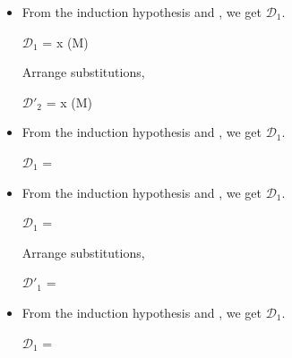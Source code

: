 \begin{itemize}
	\item \QEta
	      	      	      	      
	      From the induction hypothesis and \QEta, we get $\mathcal{D}_1$.
	      	      	      	      
	      $\mathcal{D}_1$ = 
	      { \andalso x \notin \FV(M\SB)}
	      	      	      	      
	      Arrange substitutions,
	      	      	      	      
	      $\mathcal{D}'_2$ = 
	      { \andalso x \notin \FV(M\SB)}
	      	      	      	      
	\item \QTBLTB
	      	      	      	      
	      From the induction hypothesis and \QTBLTB, we get $\mathcal{D}_1$.
	      	      	      	      
	      $\mathcal{D}_1$ = 
	      {}
	      	      	      	      
	\item \QLambda
	      	      	      	      
	      From the induction hypothesis and \QLambda, we get $\mathcal{D}_1$.
	      	      	      	      
	      $\mathcal{D}_1$ = 
	      {}
	      	      	      	      
	      Arrange substitutions,
	      	      	      	      
	      $\mathcal{D}'_1$ = 
	      {}
	      	      	      	      
	      	      	      	      
	\item \QPercent
	      	      	      	      
	      From the induction hypothesis and \QPercent, we get $\mathcal{D}_1$.
	      	      	      	      
	      $\mathcal{D}_1$ = 
	      { \andalso {} }
	      	      	      	      
	      \fi
	      	      	      	      
\end{itemize}

